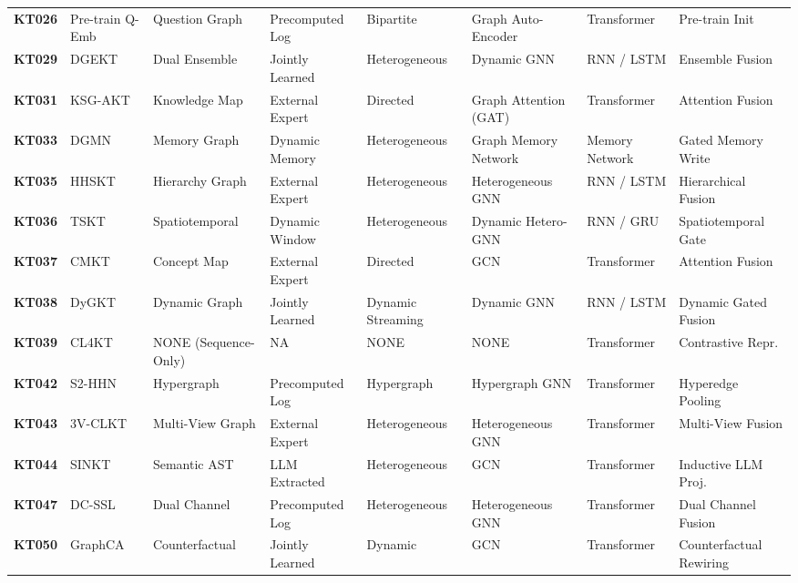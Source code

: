 \documentclass[10pt,journal,compsoc]{IEEEtran}
\begin{document}
\begin{table}[t]
{\begin{tabular}{@{}l l l l l l l l@{}}
\textbf{KT026} & Pre-train Q-Emb \cite{KT026_PretrainQ_2020} & Question Graph & Precomputed Log & Bipartite & Graph Auto-Encoder & Transformer & Pre-train Init \\
\textbf{KT029} & DGEKT \cite{KT029_DGEKT_2024} & Dual Ensemble & Jointly Learned & Heterogeneous & Dynamic GNN & RNN / LSTM & Ensemble Fusion \\
\textbf{KT031} & KSG-AKT \cite{KT031_KSGAKT_2022} & Knowledge Map & External Expert & Directed & Graph Attention (GAT) & Transformer & Attention Fusion \\
\textbf{KT033} & DGMN \cite{KT033_DGMN_2023} & Memory Graph & Dynamic Memory & Heterogeneous & Graph Memory Network & Memory Network & Gated Memory Write \\
\textbf{KT035} & HHSKT \cite{KT035_HHSKT_2023} & Hierarchy Graph & External Expert & Heterogeneous & Heterogeneous GNN & RNN / LSTM & Hierarchical Fusion \\
\textbf{KT036} & TSKT \cite{KT036_TSKT_2024} & Spatiotemporal & Dynamic Window & Heterogeneous & Dynamic Hetero-GNN & RNN / GRU & Spatiotemporal Gate \\
\textbf{KT037} & CMKT \cite{KT037_CMKT_2022} & Concept Map & External Expert & Directed & GCN & Transformer & Attention Fusion \\
\textbf{KT038} & DyGKT \cite{KT038_DyGKT_2024} & Dynamic Graph & Jointly Learned & Dynamic Streaming & Dynamic GNN & RNN / LSTM & Dynamic Gated Fusion \\
\textbf{KT039} & CL4KT \cite{KT039_CL4KT_2022} & NONE (Sequence-Only) & NA & NONE & NONE & Transformer & Contrastive Repr. \\
\textbf{KT042} & S2-HHN \cite{KT042_S2HHN_2023} & Hypergraph & Precomputed Log & Hypergraph & Hypergraph GNN & Transformer & Hyperedge Pooling \\
\textbf{KT043} & 3V-CLKT \cite{KT043_3VCLKT_2024} & Multi-View Graph & External Expert & Heterogeneous & Heterogeneous GNN & Transformer & Multi-View Fusion \\
\textbf{KT044} & SINKT \cite{KT044_SINKT_2024} & Semantic AST & LLM Extracted & Heterogeneous & GCN & Transformer & Inductive LLM Proj. \\
\textbf{KT047} & DC-SSL \cite{KT047_DCSSL_2023} & Dual Channel & Precomputed Log & Heterogeneous & Heterogeneous GNN & Transformer & Dual Channel Fusion \\
\textbf{KT050} & GraphCA \cite{KT050_GraphCA_2023} & Counterfactual & Jointly Learned & Dynamic & GCN & Transformer & Counterfactual Rewiring \\

\end{tabular}}
\end{table}
\end{document}
